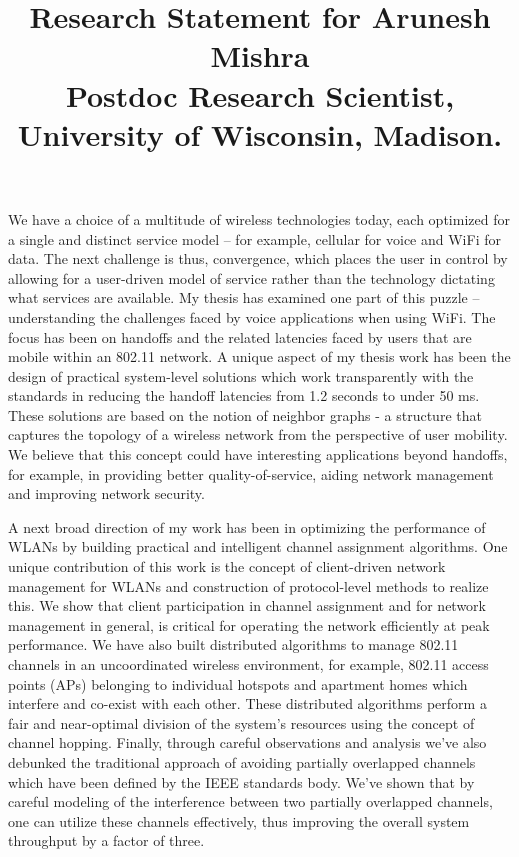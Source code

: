 \documentclass[11pt,letterpaper]{article}
\title{
\vspace{-2cm}Research Statement for Arunesh Mishra\\
{\large Postdoc Research Scientist, University of Wisconsin, Madison.}}
\begin{document}
\date{}
\maketitle
\vspace{-1cm}
We have a choice of a multitude of wireless technologies today, each optimized for a single and distinct service model -- for example, cellular for
voice and WiFi for data. The next challenge is thus, convergence, which places the user in control  by 
allowing for a user-driven model of service rather than the technology dictating what services are available. My thesis has examined one part of this puzzle --
understanding the challenges faced by voice applications when using WiFi. The focus has been on handoffs and the related
latencies faced by users that are mobile within an 802.11 network. A unique aspect of my thesis work has been the design of
practical system-level solutions which work transparently with the standards in reducing the handoff latencies from 1.2
seconds to under 50 ms. These solutions are based on the notion of neighbor graphs - a
structure that captures the topology of a wireless network from the perspective of user mobility. We believe that this
concept could have interesting applications beyond handoffs, for example, in providing better quality-of-service, aiding
network management and improving network security. 

 A next broad direction of my work has been in optimizing the performance of WLANs by building practical and
intelligent channel assignment algorithms. One unique contribution of this work is the concept of client-driven network
management for WLANs and construction of protocol-level methods to realize this. We show that client participation in
channel assignment and for network management in general, is critical for operating the network efficiently at peak
performance. We have also built distributed algorithms to manage 802.11 channels in an uncoordinated wireless
environment, for example, 802.11 access points (APs) belonging to individual hotspots and apartment homes  which interfere and co-exist with
each other. These distributed algorithms perform a fair and near-optimal division of the system's resources using the concept of
channel hopping.  Finally, through careful observations and analysis we've also debunked the traditional approach of
avoiding partially overlapped channels which have been defined by the IEEE standards body.  We've shown that by careful modeling of the interference between two partially
overlapped channels, one can utilize these channels effectively, thus improving the overall system throughput by a
factor of three.
\end{document}

